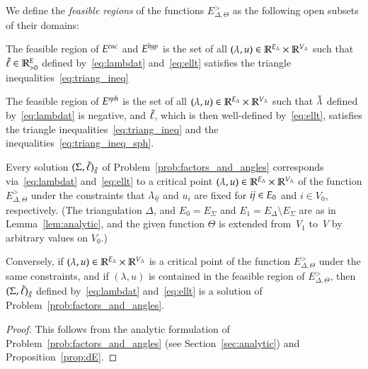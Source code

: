 \documentclass[Thesis]{subfiles}
\begin{document}
\begin{definition}
  We define the \emph{feasible regions}\/ of the functions
  $E_{\Delta,\Theta}^{\gt}$ as the following open subsets of their
  domains:
  \begin{compactitem}
  \item The feasible region of $E^{\euc}$ and $E^{\mathit{hyp}}$ is the set of
    all $(\lambda, u)\in\mathbb R^{E_{\Delta}}\times\mathbb R^{V_{\Delta}}$ such
    that $\tilde{\ell}\in\mathbb R_{>0}^{E}$ defined by~\eqref{eq:lambdat}
    and~\eqref{eq:ellt} satisfies the triangle
    inequalities~\eqref{eq:triang_ineq}
  \item The feasible region of $E^{\mathit{sph}}$ is the set of all $(\lambda,
    u)\in\mathbb R^{E_{\Delta}}\times\mathbb R^{V_{\Delta}}$ such that $\tilde{\lambda}$
    defined by~\eqref{eq:lambdat} is negative, and $\tilde{\ell}$, which is
    then well-defined by~\eqref{eq:ellt}, satisfies the triangle
    inequalities~\eqref{eq:triang_ineq} and the
    inequalities~\eqref{eq:triang_ineq_sph}.  
  \end{compactitem}
\end{definition}

\begin{theorem}
  \label{thm:variational}
  Every solution $(\Sigma,\tilde{\ell})_{\tilde{g}}$ of
  Problem~\ref{prob:factors_and_angles} corresponds
  via~\eqref{eq:lambdat} and~\eqref{eq:ellt} to a critical point\/
  $(\lambda, u)\in\mathbb R^{E_{\Delta}}\times\mathbb R^{V_{\Delta}}$ of the
  function $E^{\gt}_{\Delta,\Theta}$ under the constraints that
  $\lambda_{\it ij}$ and $u_{i}$ are fixed for ${\it ij}\in E_{0}$ and
  $i\in V_{0}$, respectively. (The triangulation $\Delta$, and
  $E_{0}=E_{\Sigma}$ and $E_{1}=E_{\Delta}\setminus E_{\Sigma}$ are as
  in Lemma~\ref{lem:analytic}, and the given function $\Theta$ is
  extended from~$V_{1}$ to~$V$ by arbitrary values on $V_{0}$.)

  Conversely, if\/ $(\lambda,
  u)\in\mathbb R^{E_{\Delta}}\times\mathbb R^{V_{\Delta}}$ is a critical point of
  the function $E^{\gt}_{\Delta,\Theta}$ under the same constraints,
  and if\/ $(\lambda, u)$ is contained in the feasible region of
  $E^{\gt}_{\Delta,\Theta}$, then\/ $(\Sigma,\tilde{\ell})_{\tilde{g}}$ defined
  by~\eqref{eq:lambdat} and~\eqref{eq:ellt} is a solution of
  Problem~\ref{prob:factors_and_angles}.
\end{theorem}

\begin{proof}
  This follows from the analytic formulation of
  Problem~\ref{prob:factors_and_angles} (see Section~\ref{sec:analytic}) and
  Proposition~\ref{prop:dE}.
\end{proof}
\end{document}
